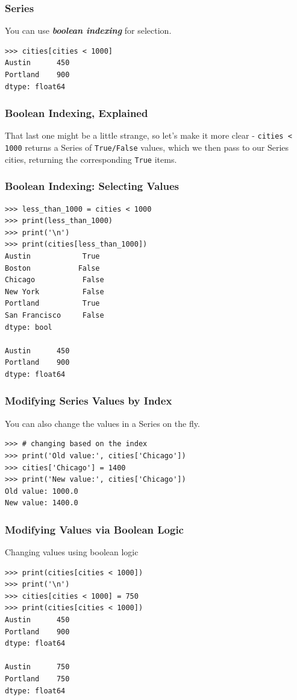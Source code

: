 \begin{frame}[fragile]\frametitle{Series}
You can use \textbf{\textit{boolean indexing}} for selection.
\begin{lstlisting}
>>> cities[cities < 1000]
Austin      450
Portland    900
dtype: float64
\end{lstlisting}
\end{frame}

\begin{frame}[fragile]\frametitle{Boolean Indexing, Explained}
That last one might be a little strange, so let's make it more clear - \texttt{cities < 1000} returns a Series of \texttt{True/False} values, which we then pass to our Series cities, returning the corresponding \texttt{True} items.
\end{frame}

\begin{frame}[fragile]\frametitle{Boolean Indexing: Selecting Values}
\begin{lstlisting}
>>> less_than_1000 = cities < 1000
>>> print(less_than_1000)
>>> print('\n')
>>> print(cities[less_than_1000])
Austin            True
Boston           False
Chicago           False
New York          False
Portland          True
San Francisco     False
dtype: bool

Austin      450
Portland    900
dtype: float64
\end{lstlisting}
\end{frame}

\begin{frame}[fragile]\frametitle{Modifying Series Values by Index}
You can also change the values in a Series on the fly.
\begin{lstlisting}
>>> # changing based on the index
>>> print('Old value:', cities['Chicago'])
>>> cities['Chicago'] = 1400
>>> print('New value:', cities['Chicago'])
Old value: 1000.0
New value: 1400.0
\end{lstlisting}
\end{frame}

\begin{frame}[fragile]\frametitle{Modifying Values via Boolean Logic}
Changing values using boolean logic
\begin{lstlisting}
>>> print(cities[cities < 1000])
>>> print('\n')
>>> cities[cities < 1000] = 750
>>> print(cities[cities < 1000])
Austin      450
Portland    900
dtype: float64

Austin      750
Portland    750
dtype: float64
\end{lstlisting}
\end{frame}

